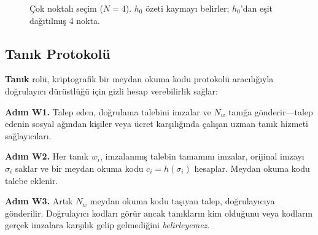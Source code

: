 \documentclass[11pt,a4paper,twocolumn]{article}
\begin{document}
\begin{figure}[ht]
\centering
{}
\caption{Çok noktalı seçim ($N{=}4$). $h_0$ özeti kaymayı belirler; $h_0$'dan eşit dağıtılmış 4 nokta.}
\label{fig:multipoint}
\end{figure}

\subsection{Tanık Protokolü}

\textbf{Tanık} rolü, kriptografik bir meydan okuma kodu protokolü aracılığıyla doğrulayıcı dürüstlüğü için gizli hesap verebilirlik sağlar:

\textbf{Adım W1.} Talep eden, doğrulama talebini imzalar ve $N_w$ tanığa gönderir---talep edenin sosyal ağından kişiler veya ücret karşılığında çalışan uzman tanık hizmeti sağlayıcıları.

\textbf{Adım W2.} Her tanık $w_i$, imzalanmış talebin tamamını imzalar, orijinal imzayı $\sigma_i$ saklar ve bir meydan okuma kodu $c_i = h(\sigma_i)$ hesaplar. Meydan okuma kodu talebe eklenir.

\textbf{Adım W3.} Artık $N_w$ meydan okuma kodu taşıyan talep, doğrulayıcıya gönderilir. Doğrulayıcı kodları görür ancak tanıkların kim olduğunu veya kodların gerçek imzalara karşılık gelip gelmediğini \emph{belirleyemez}.
\end{document}
